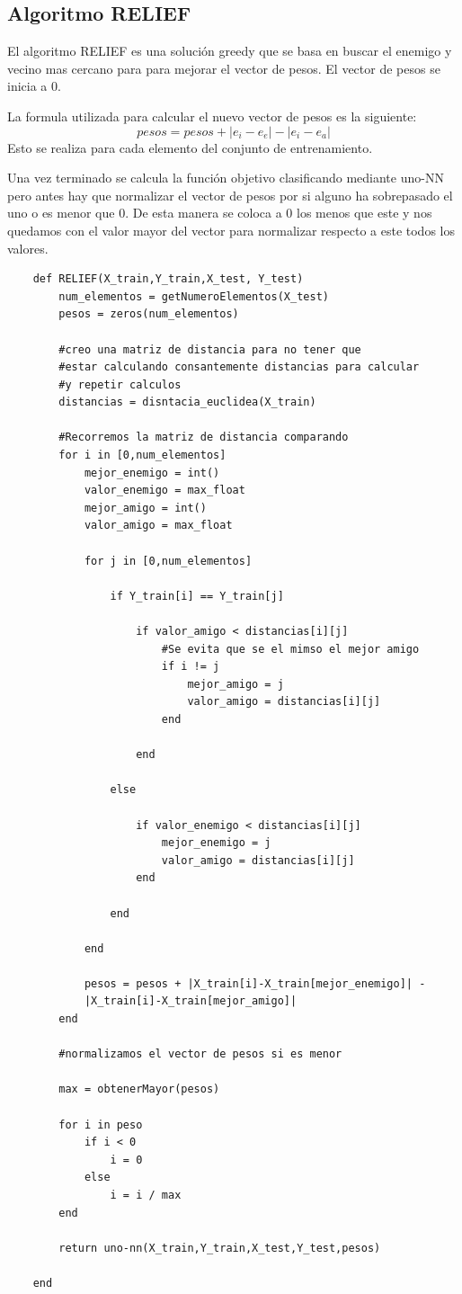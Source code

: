 \documentclass[titlepage]{article}
\begin{document}
	
	\subsection{Algoritmo RELIEF}
	El algoritmo RELIEF es una solución greedy que se basa en buscar el enemigo y vecino mas cercano para para mejorar el vector de pesos. El vector de pesos se inicia a 0.
	
	La formula utilizada para calcular el nuevo vector de pesos es la siguiente:
	$$
		pesos = pesos + | e_i-e_e | - |e_i - e_a|
	$$
	Esto se realiza para cada elemento del conjunto de entrenamiento. 
	
	Una vez terminado se calcula la función objetivo clasificando mediante uno-NN pero antes hay que normalizar el vector de pesos por si alguno ha sobrepasado el uno o es menor que 0. De esta manera se coloca a 0 los menos que este y nos quedamos con el valor mayor del vector para normalizar respecto a este todos los valores. 
	\newpage
	\begin{lstlisting}
	def RELIEF(X_train,Y_train,X_test, Y_test)
		num_elementos = getNumeroElementos(X_test)
		pesos = zeros(num_elementos)
		
		#creo una matriz de distancia para no tener que 
		#estar calculando consantemente distancias para calcular 
		#y repetir calculos
		distancias = disntacia_euclidea(X_train)
		
		#Recorremos la matriz de distancia comparando
		for i in [0,num_elementos]
			mejor_enemigo = int()
			valor_enemigo = max_float
			mejor_amigo = int()
			valor_amigo = max_float
			
			for j in [0,num_elementos]
			
				if Y_train[i] == Y_train[j]
					
					if valor_amigo < distancias[i][j]
						#Se evita que se el mimso el mejor amigo
						if i != j
							mejor_amigo = j
							valor_amigo = distancias[i][j]
						end
						
					end
					
				else
				
					if valor_enemigo < distancias[i][j]
						mejor_enemigo = j
						valor_amigo = distancias[i][j]
					end
					
				end	
				
			end
			
			pesos = pesos + |X_train[i]-X_train[mejor_enemigo]| -
			|X_train[i]-X_train[mejor_amigo]|
		end
		
		#normalizamos el vector de pesos si es menor 
		
		max = obtenerMayor(pesos)
		
		for i in peso
			if i < 0
				i = 0
			else
				i = i / max
		end
		
		return uno-nn(X_train,Y_train,X_test,Y_test,pesos)
		
	end	
	\end{lstlisting}
	\newpage
\end{document}
